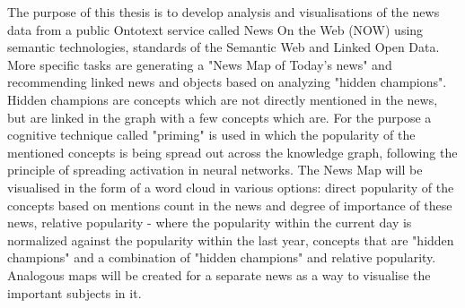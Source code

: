 
The purpose of this thesis is to develop analysis and visualisations of the news data from a public Ontotext service called News On the Web (NOW) using semantic technologies, standards of the Semantic Web and Linked Open Data. More specific tasks are generating a "News Map of Today's news" and recommending linked news and objects based on analyzing "hidden champions". Hidden champions are concepts which are not directly mentioned in the news, but are linked in the graph with a few concepts which are. For the purpose a cognitive technique called "priming" is used in which the popularity of the mentioned concepts is being spread out across the knowledge graph, following the principle of spreading activation in neural networks. The News Map will be visualised in the form of a word cloud in various options: direct popularity of the concepts based on mentions count in the news and degree of importance of these news, relative popularity - where the popularity within the current day is normalized against the popularity within the last year, concepts that are "hidden champions" and a combination of "hidden champions" and relative popularity. Analogous maps will be created for a separate news as a way to visualise the important subjects in it.